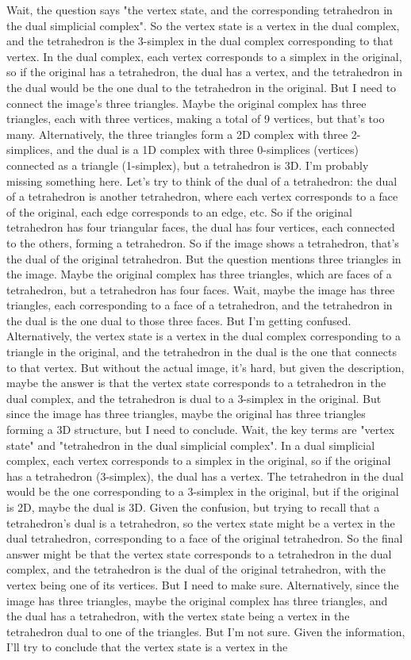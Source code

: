 Wait, the question says "the vertex state, and the corresponding tetrahedron in the dual simplicial complex". So the vertex state is a vertex in the dual complex, and the tetrahedron is the 3-simplex in the dual complex corresponding to that vertex. In the dual complex, each vertex corresponds to a simplex in the original, so if the original has a tetrahedron, the dual has a vertex, and the tetrahedron in the dual would be the one dual to the tetrahedron in the original. But I need to connect the image's three triangles. Maybe the original complex has three triangles, each with three vertices, making a total of 9 vertices, but that's too many. Alternatively, the three triangles form a 2D complex with three 2-simplices, and the dual is a 1D complex with three 0-simplices (vertices) connected as a triangle (1-simplex), but a tetrahedron is 3D. I'm probably missing something here. Let's try to think of the dual of a tetrahedron: the dual of a tetrahedron is another tetrahedron, where each vertex corresponds to a face of the original, each edge corresponds to an edge, etc. So if the original tetrahedron has four triangular faces, the dual has four vertices, each connected to the others, forming a tetrahedron. So if the image shows a tetrahedron, that's the dual of the original tetrahedron. But the question mentions three triangles in the image. Maybe the original complex has three triangles, which are faces of a tetrahedron, but a tetrahedron has four faces. Wait, maybe the image has three triangles, each corresponding to a face of a tetrahedron, and the tetrahedron in the dual is the one dual to those three faces. But I'm getting confused. Alternatively, the vertex state is a vertex in the dual complex corresponding to a triangle in the original, and the tetrahedron in the dual is the one that connects to that vertex. But without the actual image, it's hard, but given the description, maybe the answer is that the vertex state corresponds to a tetrahedron in the dual complex, and the tetrahedron is dual to a 3-simplex in the original. But since the image has three triangles, maybe the original has three triangles forming a 3D structure, but I need to conclude. Wait, the key terms are "vertex state" and "tetrahedron in the dual simplicial complex". In a dual simplicial complex, each vertex corresponds to a simplex in the original, so if the original has a tetrahedron (3-simplex), the dual has a vertex. The tetrahedron in the dual would be the one corresponding to a 3-simplex in the original, but if the original is 2D, maybe the dual is 3D. Given the confusion, but trying to recall that a tetrahedron's dual is a tetrahedron, so the vertex state might be a vertex in the dual tetrahedron, corresponding to a face of the original tetrahedron. So the final answer might be that the vertex state corresponds to a tetrahedron in the dual complex, and the tetrahedron is the dual of the original tetrahedron, with the vertex being one of its vertices. But I need to make sure. Alternatively, since the image has three triangles, maybe the original complex has three triangles, and the dual has a tetrahedron, with the vertex state being a vertex in the tetrahedron dual to one of the triangles. But I'm not sure. Given the information, I'll try to conclude that the vertex state is a vertex in the 